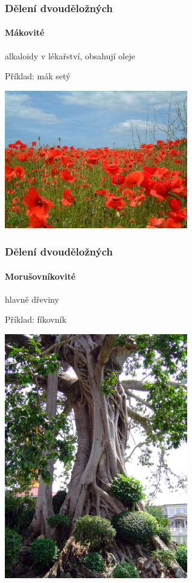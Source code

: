 \documentclass{beamer}
\begin{document}
\begin{frame}
\frametitle{Dělení dvouděložných}
	\framesubtitle{Mákovité}alkaloidy v lékařství, obsahují oleje

Příklad: mák setý

\begin{center}\includegraphics[width=8cm]{Poppy2004.jpg}\end{center}
\end{frame}
\begin{frame}
\frametitle{Dělení dvouděložných}
	\framesubtitle{Morušovníkovité}hlavně dřeviny

Příklad: fíkovník

\begin{center}\includegraphics[width=8cm]{Ficus_in_Bang_Pa_In.jpg}\end{center}
\end{frame}
\end{document}
